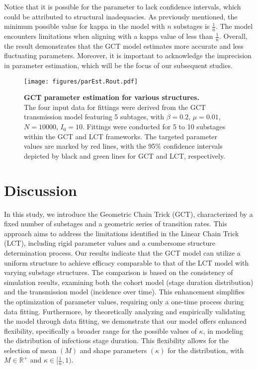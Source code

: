 \documentclass[12pt]{article}
\begin{document}
Notice that it is possible for the parameter to lack confidence intervals, which could be attributed to structural inadequacies. As previously mentioned, the minimum possible value for kappa in the model with $n$ substages is $\frac{1}{n}$. The model encounters limitations when aligning with a kappa value of less than $\frac{1}{n}$. Overall, the result demonstrates that the GCT model estimates more accurate and less fluctuating parameters. Moreover, it is important to acknowledge the imprecision in parameter estimation, which will be the focus of our subsequent studies.

\begin{figure}[h!]
    \centering
    \texttt{[image: figures/parEst.Rout.pdf]}
    \caption{\textbf{GCT parameter estimation for various structures.} \\ The four input data for fittings were derived from the GCT transmission model featuring 5 subtages, with $\beta=0.2$, $\mu=0.01$, $N=10000$, $I_0=10$. Fittings were conducted for 5 to 10 substages within the GCT and LCT frameworks. The targeted parameter values are marked by red lines, with the 95\% confidence intervals depicted by black and green lines for GCT and LCT, respectively.}
    \label{parEst}
\end{figure}


\section{Discussion}
In this study, we introduce the Geometric Chain Trick (GCT), characterized by a fixed number of substages and a geometric series of transition rates. This approach aims to address the limitations identified in the Linear Chain Trick (LCT), including rigid parameter values and a cumbersome structure determination process. Our results indicate that the GCT model can utilize a uniform structure to achieve efficacy comparable to that of the LCT model with varying substage structures. The comparison is based on the consistency of simulation results, examining both the cohort model (stage duration distribution) and the transmission model (incidence over time). This enhancement simplifies the optimization of parameter values, requiring only a one-time process during data fitting. Furthermore, by theoretically analyzing and empirically validating the model through data fitting, we demonstrate that our model offers enhanced flexibility, specifically a broader range for the possible values of $\kappa$, in modeling the distribution of infectious stage duration. This flexibility allows for the selection of mean $(M)$ and shape parameters $(\kappa)$ for the distribution, with $M \in \mathbb{R}^+$ and $\kappa \in [\frac{1}{n}, 1)$.
\end{document}

